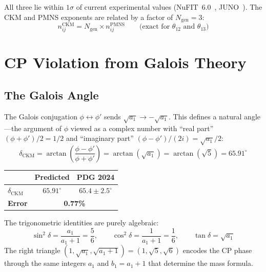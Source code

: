 \documentclass[12pt,a4paper]{article}
\theoremstyle{definition}
\begin{document}
All three lie within $1\sigma$ of current experimental values (NuFIT~6.0~\cite{nufit6}, JUNO~\cite{juno2025}). The CKM and PMNS exponents are related by a factor of $N_{\text{gen}} = 3$:
\begin{equation}
n^{\text{CKM}}_{ij} = N_{\text{gen}} \times n^{\text{PMNS}}_{ij} \qquad \text{(exact for } \theta_{12} \text{ and } \theta_{13}\text{)}
\end{equation}


\section{CP Violation from Galois Theory}
\label{sec:cp}

\subsection{The Galois Angle}

The Galois conjugation $\phi \leftrightarrow \phi'$ sends $\sqrt{a_1} \to -\sqrt{a_1}$. This defines a natural angle---the argument of $\phi$ viewed as a complex number with ``real part'' $(\phi + \phi')/2 = 1/2$ and ``imaginary part'' $(\phi - \phi')/(2i) = \sqrt{a_1}/2$:
\begin{equation}
\boxed{\delta_{\text{CKM}} = \arctan\!\left(\frac{\phi - \phi'}{\phi + \phi'}\right) = \arctan(\sqrt{a_1}) = \arctan(\sqrt{5}) = 65.91^\circ}
\label{eq:cp_ckm}
\end{equation}

\begin{center}
\begin{tabular}{lcc}
\toprule
& \textbf{Predicted} & \textbf{PDG 2024} \\
\midrule
$\delta_{\text{CKM}}$ & $65.91^\circ$ & $65.4 \pm 2.5^\circ$ \\
\textbf{Error} & \multicolumn{2}{c}{\textbf{0.77\%}} \\
\bottomrule
\end{tabular}
\end{center}

The trigonometric identities are purely algebraic:
\begin{equation}
\sin^2\delta = \frac{a_1}{a_1+1} = \frac{5}{6}, \qquad \cos^2\delta = \frac{1}{a_1+1} = \frac{1}{6}, \qquad \tan\delta = \sqrt{a_1}
\end{equation}
The right triangle $(1, \sqrt{a_1}, \sqrt{a_1+1}) = (1, \sqrt{5}, \sqrt{6})$ encodes the CP phase through the same integers $a_1$ and $b_1 = a_1 + 1$ that determine the mass formula.
\end{document}
